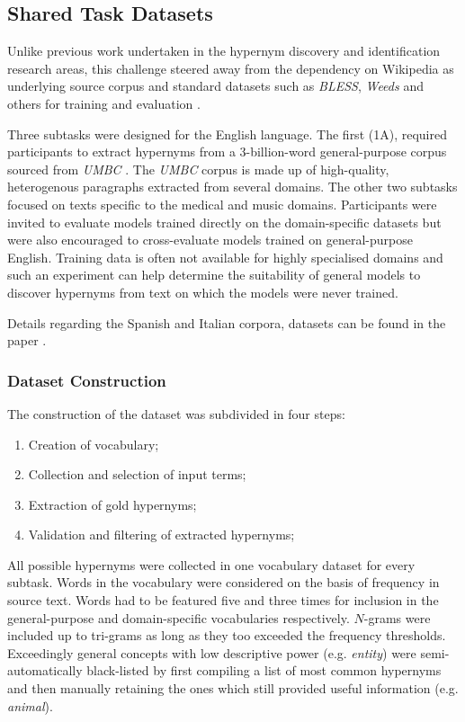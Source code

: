 \subsection{Shared Task Datasets}
Unlike previous work undertaken in the hypernym discovery and identification research areas, this challenge steered away from the dependency on Wikipedia as underlying source corpus \citep{espinosa2016supervised, shwartz2016path, shwartz2017siege} and 
standard datasets such as \textit{BLESS}, \textit{Weeds} and others for training and evaluation \citep{ustalov2017negative, yamane2016distributional, shwartz2016path}.  

Three subtasks were designed for the English language.  The first (1A), required participants to extract hypernyms from a 3-billion-word general-purpose corpus sourced from \textit{UMBC} \citep{han2013umbc_ebiquity}.  The \textit{UMBC} corpus is made up of high-quality, heterogenous paragraphs extracted from several domains.  The other two subtasks focused on texts specific to the medical and music domains.  Participants were invited to evaluate  models trained directly on the domain-specific datasets but were also encouraged to cross-evaluate models trained on general-purpose English.  Training data is often not available for highly specialised domains and such an experiment can help determine the suitability of general models to discover hypernyms from text on which the models were never trained.

Details regarding the Spanish and Italian corpora, datasets can be found in the paper \citep{camacho2018semeval}.

\subsubsection{Dataset Construction}
The construction of the dataset was subdivided in four steps:
\begin{enumerate}
    \item Creation of vocabulary;
    \item Collection and selection of input terms;
    \item Extraction of gold hypernyms;
    \item Validation and filtering of extracted hypernyms;
\end{enumerate}
All possible hypernyms were collected in one vocabulary dataset for every subtask.  Words in the vocabulary were considered on the basis of frequency in source text.  Words had to be featured five and three times for inclusion in the general-purpose and domain-specific vocabularies respectively.  $N$-grams were included up to tri-grams as long as they too exceeded the frequency thresholds.  Exceedingly general concepts with low descriptive power (e.g. \textit{entity}) were semi-automatically black-listed by first compiling a list of most common hypernyms and then manually retaining the ones which still provided useful information (e.g. \textit{animal}).


